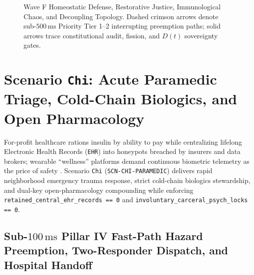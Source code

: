 \begin{figure}[htbp]
{%
}
\caption{Wave F Homeostatic Defense, Restorative Justice, Immunological Chaos, and Decoupling Topology. Dashed crimson arrows denote sub-$500\,\mathrm{ms}$ Priority Tier 1--2 interrupting preemption paths; solid arrows trace constitutional audit, fission, and $D(t)$ sovereignty gates.}
\label{fig:wave-f-topology}
\end{figure}

\section{Scenario \texttt{Chi}: Acute Paramedic Triage, Cold-Chain Biologics, and Open Pharmacology}
\label{sec:scn-chi}

For-profit healthcare rations insulin by ability to pay while centralizing lifelong Electronic Health Records (\texttt{EHR}) into honeypots breached by
insurers and data brokers; wearable ``wellness'' platforms demand continuous biometric telemetry as the price of safety
\parencite{zuboff2019,illich1973}. Scenario \texttt{Chi} (\texttt{SCN-CHI-PARAMEDIC}) delivers rapid neighborhood emergency trauma response, strict
cold-chain biologics stewardship, and dual-key open-pharmacology compounding while enforcing \texttt{retained\_central\_ehr\_records == 0} and
\texttt{involuntary\_carceral\_psych\_locks == 0}.

\subsection{Sub-$100\,\mathrm{ms}$ Pillar IV Fast-Path Hazard Preemption, Two-Responder Dispatch, and Hospital Handoff}

